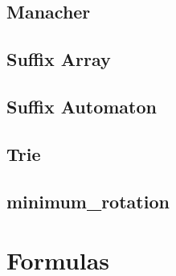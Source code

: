 \subsection{Manacher}

\subsection{Suffix Array}

\subsection{Suffix Automaton}
\subsection{Trie}
\subsection{minimum\_rotation}

\section{Formulas}

